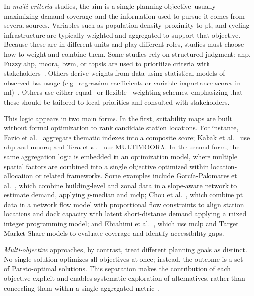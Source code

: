 In \textit{multi-criteria} studies, the aim is a single planning objective--usually maximizing demand coverage--and the information used to pursue it comes from several sources. Variables such as population density, proximity to \ac{pt}, and cycling infrastructure are typically weighted and aggregated to support that objective. Because these are in different units and play different roles, studies must choose how to weight and combine them. Some studies rely on structured judgment: \ac{ahp}, Fuzzy \ac{ahp}, \ac{moora}, \ac{bwm}, or \ac{topsis} are used to prioritize criteria with stakeholders~\cite{Kabak2018, Guler2021a, Guler2021b, Bahadori2022}. Others derive weights from data using statistical models of observed \ac{bss} usage (e.g.\ regression coefficients or variable importance scores in \ac{ml})~\cite{Wang2021}. Others use either equal~\cite{Fazio2021, Tera2023} or flexible~\cite{Veillette2018} weighting schemes, emphasizing that these should be tailored to local priorities and consulted with stakeholders.

This logic appears in two main forms. In the first, suitability maps are built without formal optimization to rank candidate station locations. For instance, Fazio et al.~\cite{Fazio2021} aggregate thematic indexes into a composite score; Kabak et al.~\cite{Kabak2018} use \ac{ahp} and \ac{moora}; and Tera et al.~\cite{Tera2023} use MULTIMOORA. In the second form, the same aggregation logic is embedded in an optimization model, where multiple spatial factors are combined into a single objective optimized within location-allocation or related frameworks. Some examples include García-Palomares et al.~\cite{GarciaPalomares2012}, which combine building-level and zonal data in a slope-aware network to estimate demand, applying $p$-median and \ac{mclp}; Chou et al.~\cite{Chou2019}, which combine \ac{pt} data in a network flow model with proportional flow constraints to align station locations and dock capacity with latent short-distance demand applying a mixed integer programming model; and Ebrahimi et al.~\cite{Ebrahimi2022}, which use \ac{mclp} and Target Market Share models to evaluate coverage and identify accessibility gaps.

\textit{Multi-objective} approaches, by contrast, treat different planning goals as distinct. No single solution optimizes all objectives at once; instead, the outcome is a set of Pareto-optimal solutions. This separation makes the contribution of each objective explicit and enables systematic exploration of alternatives, rather than concealing them within a single aggregated metric~\cite{Rahimi2023, honegumi}. 

